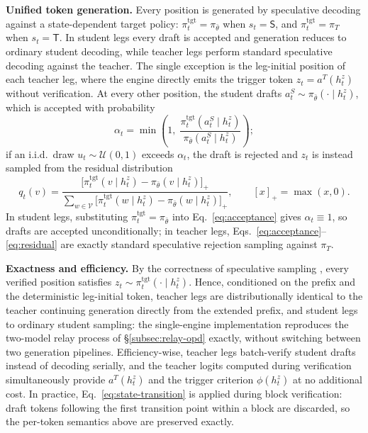 \documentclass{article} %
\begin{document}
\textbf{Unified token generation.} Every position is generated by speculative decoding against a state-dependent target policy: $\pi^{\mathrm{tgt}}_t=\pi_{\bar\theta}$ when $s_t=\mathsf{S}$, and $\pi^{\mathrm{tgt}}_t=\pi_T$ when $s_t=\mathsf{T}$. In student legs every draft is accepted and generation reduces to ordinary student decoding, while teacher legs perform standard speculative decoding against the teacher. The single exception is the leg-initial position of each teacher leg, where the engine directly emits the trigger token $z_t=a^T(h_t^z)$ without verification. At every other position, the student drafts $a_t^S\sim\pi_{\bar\theta}(\cdot\mid h_t^z)$, which is accepted with probability
\begin{equation}
\alpha_t
=\min\!\left(1,\;
\frac{\pi^{\mathrm{tgt}}_t(a_t^S\mid h_t^z)}
{\pi_{\bar\theta}(a_t^S\mid h_t^z)}\right);
\label{eq:acceptance}
\end{equation}
if an i.i.d.\ draw $u_t\sim\mathcal U(0,1)$ exceeds $\alpha_t$, the draft is rejected and $z_t$ is instead sampled from the residual distribution
\begin{equation}
q_t(v)=
\frac{\bigl[\pi^{\mathrm{tgt}}_t(v\mid h_t^z)-\pi_{\bar\theta}(v\mid h_t^z)\bigr]_+}
{\sum_{w\in\mathcal V}
\bigl[\pi^{\mathrm{tgt}}_t(w\mid h_t^z)-\pi_{\bar\theta}(w\mid h_t^z)\bigr]_+},
\qquad [x]_+=\max(x,0).
\label{eq:residual}
\end{equation}
In student legs, substituting $\pi^{\mathrm{tgt}}_t=\pi_{\bar\theta}$ into Eq.~\eqref{eq:acceptance} gives $\alpha_t\equiv1$, so drafts are accepted unconditionally; in teacher legs, Eqs.~\eqref{eq:acceptance}--\eqref{eq:residual} are exactly standard speculative rejection sampling against $\pi_T$.\par

\textbf{Exactness and efficiency.} By the correctness of speculative sampling \citep{leviathan2023fast}, every verified position satisfies $z_t\sim\pi^{\mathrm{tgt}}_t(\cdot\mid h_t^z)$. Hence, conditioned on the prefix and the deterministic leg-initial token, teacher legs are distributionally identical to the teacher continuing generation directly from the extended prefix, and student legs to ordinary student sampling: the single-engine implementation reproduces the two-model relay process of \S\ref{subsec:relay-opd} exactly, without switching between two generation pipelines. Efficiency-wise, teacher legs batch-verify student drafts instead of decoding serially, and the teacher logits computed during verification simultaneously provide $a^T(h_t^z)$ and the trigger criterion $\phi(h_t^z)$ at no additional cost. In practice, Eq.~\eqref{eq:state-transition} is applied during block verification: draft tokens following the first transition point within a block are discarded, so the per-token semantics above are preserved exactly.\par
\end{document}
